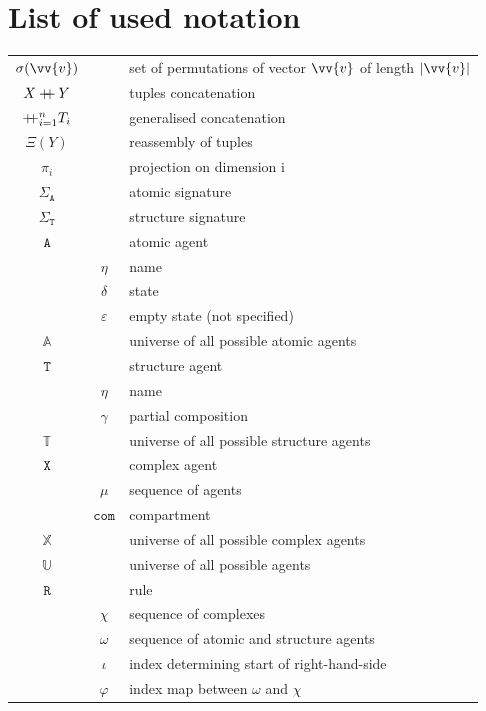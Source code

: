 \documentclass[12pt]{fithesis2}
\newcommand\mdoubleplus{\mathbin{+\mkern-7mu+}}
\begin{document}



\appendix

\chapter{List of used notation}

\begin{tabular}{c c | l}
$\sigma(\vv{v})$ & & set of permutations of vector $\vv{v}$ of length $|\vv{v}|$\\
$X \mdoubleplus Y$ & & tuples concatenation\\
$\mdoubleplus_{i=1}^n T_i$ & & generalised concatenation\\
$\Xi(Y)$ & & reassembly of tuples\\
$\pi_i$ & & projection on dimension i\\
\hline 
$\Sigma_{\mathtt{A}}$ & & atomic signature \\
$\Sigma_{\mathtt{T}}$ & & structure signature \\
\hline 
$\mathtt{A}$ & & atomic agent \\
 & $\eta$ & name \\
 & $\delta$ & state \\
 & $\varepsilon$ & empty state (not specified)\\
$\mathds{A}$ & & universe of all possible atomic agents \\
\hline 
$\mathtt{T}$ & & structure agent \\
 & $\eta$ & name \\
 & $\gamma$ & partial composition\\
$\mathds{T}$ & & universe of all possible structure agents\\
\hline 
$\mathtt{X}$ & & complex agent\\
 & $\mu$ & sequence of agents\\
 & $\mathtt{com}$ & compartment\\
$\mathds{X}$ & & universe of all possible complex agents\\
$\mathds{U}$ & & universe of all possible agents\\
\hline 
$\mathtt{R}$ & & rule\\
 & $\chi$ & sequence of complexes\\
 & $\omega$ & sequence of atomic and structure agents\\
 & $\iota$ & index determining start of right-hand-side\\
 & $\varphi$ & index map between $\omega$ and $\chi$\\

\end{tabular}
\end{document}
